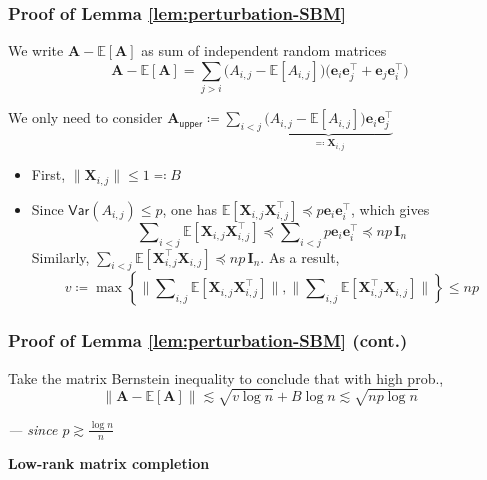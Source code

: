 \documentclass[compress,
mathserif,wide,%
]{beamer}
\begin{document}
\begin{frame}
\frametitle{Proof of Lemma \ref{lem:perturbation-SBM}}
We write $\bm{A}-\mathbb{E}[\bm{A}]$ as sum of independent random matrices
\[
\bm{A}-\mathbb{E}[\bm{A}] = \sum_{j > i} \big(A_{i,j}-\mathbb{E}[A_{i,j}]\big) \big ( \bm{e}_{i}\bm{e}_{j}^{\top} +\bm{e}_{j}\bm{e}_{i}^{\top} )
\]

We only need to consider $\bm{A}_{\mathsf{upper}} \coloneqq \sum_{  i < j} \underbrace{\big(A_{i,j}-\mathbb{E}[A_{i,j}]\big) \bm{e}_{i}\bm{e}_{j}^{\top}}_{\eqqcolon \bm{X}_{i,j}} $



\begin{itemize}
\itemsep0.5em
\item First, $\|\bm{X}_{i,j}\|\leq1 \eqqcolon B$
\item Since $\mathsf{Var}(A_{i,j})\leq p$, one has
$\mathbb{E}\left[\bm{X}_{i,j}\bm{X}_{i,j}^{\top}\right]\preceq p\bm{e}_{i}\bm{e}_{i}^{\top}$, which gives
%
\[
\sum\nolimits_{i < j}\mathbb{E}\left[\bm{X}_{i,j}\bm{X}_{i,j}^{\top}\right]\preceq\sum\nolimits_{i<j}p \bm{e}_{i}\bm{e}_{i}^{\top} \preceq np\,\bm{I}_{n}
\]
%
Similarly, $\sum_{i<j}\mathbb{E}\left[ \bm{X}_{i,j}^{\top} \bm{X}_{i,j} \right]\preceq np\,\bm{I}_{n}$.
As a result,
%
\[
v \coloneqq \max\left\{ \Big\|\sum\nolimits_{i,j}\mathbb{E}\left[\bm{X}_{i,j}\bm{X}_{i,j}^{\top}\right]\Big\|,\Big\|\sum\nolimits_{i,j}\mathbb{E}\left[\bm{X}_{i,j}^{\top}\bm{X}_{i,j}\right]\Big\|\right\} \leq np
\]
%


%
\end{itemize}
%
%




\end{frame}


\begin{frame}
	\frametitle{Proof of Lemma \ref{lem:perturbation-SBM} (cont.)}
		
Take the matrix Bernstein inequality to conclude that with high prob.,
%
\begin{equation*}
	\|\bm{A}-\mathbb{E}[\bm{A}]\|\lesssim\sqrt{v\log n}+B\log n\lesssim \sqrt{np\log n} 
\end{equation*}

\hfill \em --- since $p \gtrsim \frac{\log n}{n}$
\end{frame}



\begin{frame}[plain]
	\vfill
	\centering
	\large \bf Low-rank matrix completion
	\vfill
\end{frame}
\end{document}
